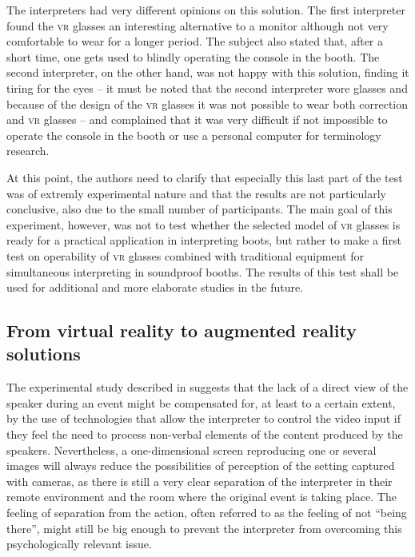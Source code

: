 \documentclass[output=paper]{langsci/langscibook}
\begin{document}
The interpreters had very different opinions on this solution. The first interpreter found the \textsc{vr} glasses an interesting alternative to a monitor although not very comfortable to wear for a longer period. The subject also stated that, after a short time, one gets used to blindly operating the console in the booth. The second interpreter, on the other hand, was not happy with this solution, finding it tiring for the eyes -- it must be noted that the second interpreter wore glasses and because of the design of the \textsc{vr} glasses it was not possible to wear both correction and \textsc{vr} glasses -- and complained that it was very difficult if not impossible to operate the console in the booth or use a personal computer for terminology research.

At this point, the authors need to clarify that especially this last part of the test was of extremly experimental nature and that the results are not particularly conclusive, also due to the small number of participants. The main goal of this experiment, however, was not to test whether the selected model of \textsc{vr} glasses is ready for a practical application in interpreting boots, but rather to make a first test on operability of \textsc{vr} glasses combined with traditional equipment for simultaneous interpreting in soundproof booths. The results of this test shall be used for additional and more elaborate studies in the future.

\subsection{From virtual reality to augmented reality solutions}

The experimental study described in  suggests that the lack of a direct view of the speaker during an event might be compensated for, at least to a certain extent, by the use of technologies that allow the interpreter to control the video input if they feel the need to process non-verbal elements of the content produced by the speakers. Nevertheless, a one-dimensional screen reproducing one or several images will always reduce the possibilities of perception of the setting captured with cameras, as there is still a very clear separation of the interpreter in their remote environment and the room where the original event is taking place. The feeling of separation from the action, often referred to as the feeling of not “being there”, might still be big enough to prevent the interpreter from overcoming this psychologically relevant issue. 
\end{document}
